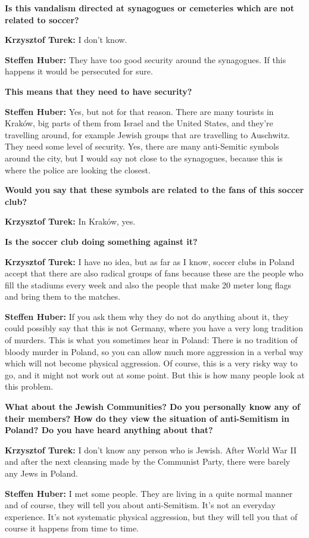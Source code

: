 \textbf{Is this vandalism directed at synagogues or cemeteries which are not related to soccer?} 

\textbf{Krzysztof Turek:} I don't know.\par
\textbf{Steffen Huber:} They have too good security around the synagogues. If this happens it would be persecuted for sure. 

\textbf{This means that they need to have security?}  

\textbf{Steffen Huber:} Yes, but not for that reason. There are many tourists in Kraków, big parts of them from Israel and the United States, and they're travelling around, for example Jewish groups that are travelling to Auschwitz. They need some level of security. Yes, there are many anti-Semitic symbols around the city, but I would say not close to the synagogues, because this is where the police are looking the closest. 

\textbf{Would you say that these symbols are related to the fans of this soccer club?} 

\textbf{Krzysztof Turek:} In Kraków, yes. 

\textbf{Is the soccer club doing something against it?} 

\textbf{Krzysztof Turek:} I have no idea, but as far as I know, soccer clubs in Poland accept that there are also radical groups of fans because these are the people who fill the stadiums every week and also the people that make 20 meter long flags and bring them to the matches. \par
\textbf{Steffen Huber:} If you ask them why they do not do anything about it, they could possibly say that this is not Germany, where you have a very long tradition of murders. This is what you sometimes hear in Poland: There is no tradition of bloody murder in Poland, so you can allow much more aggression in a verbal way which will not become physical aggression. Of course, this is a very risky way to go, and it might not work out at some point. But this is how many people look at this problem. 

\textbf{What about the Jewish Communities? Do you personally know any of their members? How do they view the situation of anti-Semitism in Poland? Do you have heard anything about that?}  

\textbf{Krzysztof Turek:} I don’t know any person who is Jewish. After World War II and after the next cleansing made by the Communist Party, there were barely any Jews in Poland. \par
\textbf{Steffen Huber:} I met some people. They are living in a quite normal manner and of course, they will tell you about anti-Semitism. It’s not an everyday experience. It's not systematic physical aggression, but they will tell you that of course it happens from time to time. 

